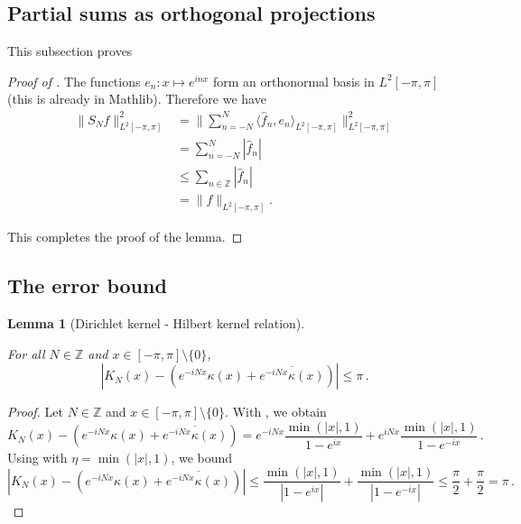 \documentclass[10pt,a4paper]{article}
\theoremstyle{plain}
\newtheorem{lemma}[theorem]{Lemma}
\theoremstyle{definition}
\numberwithin{equation}{subsection}
\newcommand{\Z}{{\mathbb{Z}}}
\newcommand{\lean}[1]{}
\newcommand{\proves}[1]{}
\newcommand{\uses}[1]{}
\newcommand{\leanok}{}
\begin{document}
\subsection{Partial sums as orthogonal projections}
\label{10projection}

This subsection proves 

\begin{proof}[Proof of ]
\proves{spectral-projection-bound}
\leanok

The functions $e_n:x\mapsto e^{inx}$ form an orthonormal basis in $L^2[-\pi, \pi]$
(this is already in Mathlib).
Therefore we have
\begin{align*}
    \|S_Nf\|^2_{L^2[-\pi, \pi]}
    &= \|\sum_{n=-N}^N \langle\widehat{f}_n, e_n\rangle_{L^2[-\pi, \pi]}\|^2_{L^2[-\pi, \pi]} \\
    &= \sum_{n=-N}^N |\widehat{f}_n| \\
    &\le \sum_{n\in \mathbb{Z}} |\widehat{f}_n| \\
    &= \|f\|_{L^2[-\pi, \pi]}.
\end{align*}

This completes the proof of the lemma.
\end{proof}

\subsection{The error bound}
\label{10difference}

\begin{lemma}[Dirichlet kernel - Hilbert kernel relation]
    \label{Dirichlet-Hilbert}
    \leanok
    \lean{Dirichlet_Hilbert_diff}
    \uses{Dirichlet-kernel,lower-secant-bound}
    For all $N\in\Z$ and $x\in [-\pi,\pi] \setminus \{0\}$,
    \begin{equation*}
        \left|K_N(x) - (e^{-iNx}\kappa(x) + \overline{e^{-iNx}\kappa(x)})\right| \le \pi \,.
    \end{equation*}
\end{lemma}

\begin{proof}
    \leanok
    Let $N\in\Z$ and $x\in [-\pi,\pi] \setminus \{0\}$. With , we obtain
    \begin{equation*}
        K_N(x) - (e^{-iNx}\kappa(x) + \overline{e^{-iNx}\kappa(x)})
        = e^{-iNx} \frac{\min(|x|, 1) }{1 - e^{ix}} + e^{iNx} \frac{\min(|x|, 1) }{1 - e^{-ix}} \,.
    \end{equation*}
    Using  with $\eta = \min(|x|, 1)$, we bound
    \begin{equation*}
        \left|K_N(x) - (e^{-iNx}\kappa(x) + \overline{e^{-iNx}\kappa(x)})\right|
        \le \frac{\min(|x|, 1) }{|1 - e^{ix}|} + \frac{\min(|x|, 1)}{|1 - e^{-ix}|}
        \le \frac{\pi}{2} + \frac{\pi}{2} = \pi \,.
    \end{equation*}
\end{proof}
\end{document}
